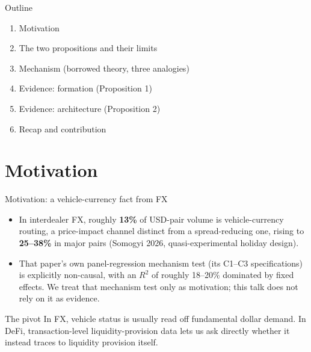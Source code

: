 \documentclass[aspectratio=169]{beamer}
\begin{document}
\begin{frame}{Outline}
  \begin{enumerate}
    \item Motivation
    \item The two propositions and their limits
    \item Mechanism (borrowed theory, three analogies)
    \item Evidence: formation (Proposition 1)
    \item Evidence: architecture (Proposition 2)
    \item Recap and contribution
  \end{enumerate}
\end{frame}

\section{Motivation}

\begin{frame}{Motivation: a vehicle-currency fact from FX}
  \begin{itemize}
    \item In interdealer FX, roughly \textbf{13\%} of USD-pair volume is vehicle-currency routing, a price-impact channel distinct from a spread-reducing one, rising to \textbf{25--38\%} in major pairs (Somogyi 2026, quasi-experimental holiday design).
    \item That paper's own panel-regression mechanism test (its C1--C3 specifications) is explicitly non-causal, with an $R^2$ of roughly 18--20\% dominated by fixed effects. We treat that mechanism test only as motivation; this talk does not rely on it as evidence.
  \end{itemize}
  \vspace{1em}
  \begin{block}{The pivot}
    In FX, vehicle status is usually read off fundamental dollar demand. In DeFi, transaction-level liquidity-provision data lets us ask directly whether it instead traces to liquidity provision itself.
  \end{block}
\end{frame}
\end{document}
